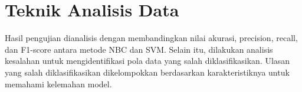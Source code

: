 \section{Teknik Analisis Data}

Hasil pengujian dianalisis dengan membandingkan nilai akurasi, precision, recall, dan F1-score antara metode NBC dan SVM. Selain itu, dilakukan analisis kesalahan untuk mengidentifikasi pola data yang salah diklasifikasikan. Ulasan yang salah diklasifikasikan dikelompokkan berdasarkan karakteristiknya untuk memahami kelemahan model.
